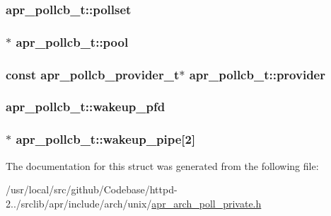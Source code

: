 \subsubsection[{\texorpdfstring{pollset}{pollset}}]{ apr\+\_\+pollcb\+\_\+t\+::pollset}\hypertarget{structapr__pollcb__t_a4334b3d1e7a4b9acbb633d3575ae389d}{}\label{structapr__pollcb__t_a4334b3d1e7a4b9acbb633d3575ae389d}
\subsubsection[{\texorpdfstring{pool}{pool}}]{$\ast$ apr\+\_\+pollcb\+\_\+t\+::pool}\hypertarget{structapr__pollcb__t_a6d9b05e3797933c5e537312fe772b6a8}{}\label{structapr__pollcb__t_a6d9b05e3797933c5e537312fe772b6a8}
\subsubsection[{\texorpdfstring{provider}{provider}}]{\setlength{\rightskip}{0pt plus 5cm}const {\bf apr\+\_\+pollcb\+\_\+provider\+\_\+t}$\ast$ apr\+\_\+pollcb\+\_\+t\+::provider}\hypertarget{structapr__pollcb__t_a1a37e54764975f049ff4b5c300214122}{}\label{structapr__pollcb__t_a1a37e54764975f049ff4b5c300214122}
\subsubsection[{\texorpdfstring{wakeup\+\_\+pfd}{wakeup_pfd}}]{ apr\+\_\+pollcb\+\_\+t\+::wakeup\+\_\+pfd}\hypertarget{structapr__pollcb__t_a10d7ad8140671fc7ec01282be5410a68}{}\label{structapr__pollcb__t_a10d7ad8140671fc7ec01282be5410a68}
\subsubsection[{\texorpdfstring{wakeup\+\_\+pipe}{wakeup_pipe}}]{$\ast$ apr\+\_\+pollcb\+\_\+t\+::wakeup\+\_\+pipe\mbox{[}2\mbox{]}}\hypertarget{structapr__pollcb__t_a09bc1fda39715e7bada816353921db11}{}\label{structapr__pollcb__t_a09bc1fda39715e7bada816353921db11}


The documentation for this struct was generated from the following file\+:\begin{DoxyCompactItemize}
\item 
/usr/local/src/github/\+Codebase/httpd-\/2../srclib/apr/include/arch/unix/\hyperlink{apr__arch__poll__private_8h}{apr\+\_\+arch\+\_\+poll\+\_\+private.\+h}\end{DoxyCompactItemize}
